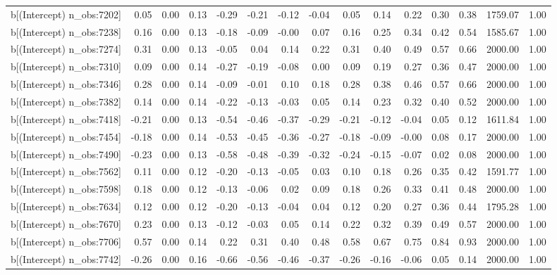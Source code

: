\begin{table}[ht]
\begin{tabular}{rrrrrrrrrrrrrrr}
  b[(Intercept) n\_obs:7202] & 0.05 & 0.00 & 0.13 & -0.29 & -0.21 & -0.12 & -0.04 & 0.05 & 0.14 & 0.22 & 0.30 & 0.38 & 1759.07 & 1.00 \\ 
  b[(Intercept) n\_obs:7238] & 0.16 & 0.00 & 0.13 & -0.18 & -0.09 & -0.00 & 0.07 & 0.16 & 0.25 & 0.34 & 0.42 & 0.54 & 1585.67 & 1.00 \\ 
  b[(Intercept) n\_obs:7274] & 0.31 & 0.00 & 0.13 & -0.05 & 0.04 & 0.14 & 0.22 & 0.31 & 0.40 & 0.49 & 0.57 & 0.66 & 2000.00 & 1.00 \\ 
  b[(Intercept) n\_obs:7310] & 0.09 & 0.00 & 0.14 & -0.27 & -0.19 & -0.08 & 0.00 & 0.09 & 0.19 & 0.27 & 0.36 & 0.47 & 2000.00 & 1.00 \\ 
  b[(Intercept) n\_obs:7346] & 0.28 & 0.00 & 0.14 & -0.09 & -0.01 & 0.10 & 0.18 & 0.28 & 0.38 & 0.46 & 0.57 & 0.66 & 2000.00 & 1.00 \\ 
  b[(Intercept) n\_obs:7382] & 0.14 & 0.00 & 0.14 & -0.22 & -0.13 & -0.03 & 0.05 & 0.14 & 0.23 & 0.32 & 0.40 & 0.52 & 2000.00 & 1.00 \\ 
  b[(Intercept) n\_obs:7418] & -0.21 & 0.00 & 0.13 & -0.54 & -0.46 & -0.37 & -0.29 & -0.21 & -0.12 & -0.04 & 0.05 & 0.12 & 1611.84 & 1.00 \\ 
  b[(Intercept) n\_obs:7454] & -0.18 & 0.00 & 0.14 & -0.53 & -0.45 & -0.36 & -0.27 & -0.18 & -0.09 & -0.00 & 0.08 & 0.17 & 2000.00 & 1.00 \\ 
  b[(Intercept) n\_obs:7490] & -0.23 & 0.00 & 0.13 & -0.58 & -0.48 & -0.39 & -0.32 & -0.24 & -0.15 & -0.07 & 0.02 & 0.08 & 2000.00 & 1.00 \\ 
  b[(Intercept) n\_obs:7562] & 0.11 & 0.00 & 0.12 & -0.20 & -0.13 & -0.05 & 0.03 & 0.10 & 0.18 & 0.26 & 0.35 & 0.42 & 1591.77 & 1.00 \\ 
  b[(Intercept) n\_obs:7598] & 0.18 & 0.00 & 0.12 & -0.13 & -0.06 & 0.02 & 0.09 & 0.18 & 0.26 & 0.33 & 0.41 & 0.48 & 2000.00 & 1.00 \\ 
  b[(Intercept) n\_obs:7634] & 0.12 & 0.00 & 0.12 & -0.20 & -0.13 & -0.04 & 0.04 & 0.12 & 0.20 & 0.27 & 0.36 & 0.44 & 1795.28 & 1.00 \\ 
  b[(Intercept) n\_obs:7670] & 0.23 & 0.00 & 0.13 & -0.12 & -0.03 & 0.05 & 0.14 & 0.22 & 0.32 & 0.39 & 0.49 & 0.57 & 2000.00 & 1.00 \\ 
  b[(Intercept) n\_obs:7706] & 0.57 & 0.00 & 0.14 & 0.22 & 0.31 & 0.40 & 0.48 & 0.58 & 0.67 & 0.75 & 0.84 & 0.93 & 2000.00 & 1.00 \\ 
  b[(Intercept) n\_obs:7742] & -0.26 & 0.00 & 0.16 & -0.66 & -0.56 & -0.46 & -0.37 & -0.26 & -0.16 & -0.06 & 0.05 & 0.14 & 2000.00 & 1.00 \\ 

\end{tabular}
\end{table}
